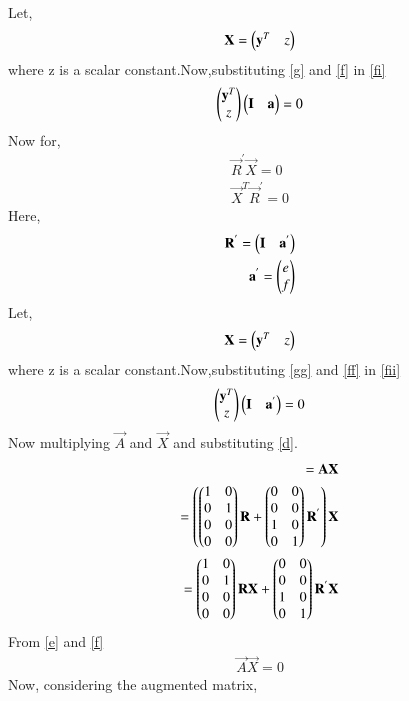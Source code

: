 \documentclass[journal,12pt,twocolumn]{IEEEtran}
\begin{document}
\begin{enumerate}
\begin{align}
  \end{align}
  Let,
  \begin{align}
  \mathbf{X}=\begin{pmatrix}\mathbf{y}^T&z\end{pmatrix}\label{g}
  \end{align}
  where z is a scalar constant.Now,substituting \eqref{g} and \eqref{f} in \eqref{fi}
  \begin{align}
  \begin{pmatrix}\mathbf{y}^T\\z\end{pmatrix}\begin{pmatrix}\mathbf{I}& \mathbf{a}\end{pmatrix}=0
  \end{align}
  Now for,
  \begin{align}
  \vec{R}^{'}\vec{X}=0\label{ee}\\
  \vec{X}^{T}\vec{R}^{'}=0\label{fii}
  \end{align}
  Here,
  \begin{align}
  \mathbf{R}^{'}=\begin{pmatrix}\mathbf{I}& \mathbf{a}^{'}\end{pmatrix}\label{ff}\\
  \mathbf{a}^{'}=\begin{pmatrix}e\\f\end{pmatrix}
  \end{align}
  Let,
  \begin{align}
  \mathbf{X}=\begin{pmatrix}\mathbf{y}^T&z\end{pmatrix}\label{gg}
  \end{align}
  where z is a scalar constant.Now,substituting \eqref{gg} and \eqref{ff} in \eqref{fii}
  \begin{align}
  \begin{pmatrix}\mathbf{y}^T\\z\end{pmatrix}\begin{pmatrix}\mathbf{I}& \mathbf{a}^{'}\end{pmatrix}=0
  \end{align}
Now multiplying $\vec{A}$ and $\vec{X}$ and substituting \eqref{d}.
  \begin{align}
  =\mathbf{A}\mathbf{X}\\
  =\left(\begin{pmatrix}1&0\\0&1\\0&0\\0&0\end{pmatrix}\mathbf{R}+\begin{pmatrix}0&0\\0&0\\1&0\\0&1\end{pmatrix}\mathbf{R}^{'}\right)\mathbf{X}\\
  =\begin{pmatrix}1&0\\0&1\\0&0\\0&0\end{pmatrix}\mathbf{R}\mathbf{X}+\begin{pmatrix}0&0\\0&0\\1&0\\0&1\end{pmatrix}\mathbf{R}^{'}\mathbf{X} \end{align}
  From \eqref{e} and \eqref{f}
  \begin{align}
  \vec{A}\vec{X}=0
  \end{align}
  Now, considering the augmented matrix,

\end{enumerate}
\end{document}
